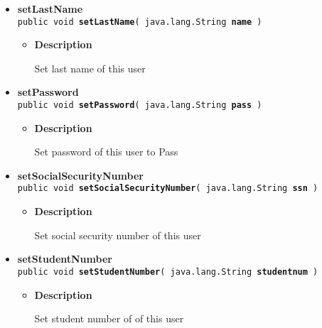 {{{\begin{itemize}
{\begin{itemize}
{Set the preferred language of this user. The language is either "EN" or "FI
}
\item{
{\bf Parameters}
  \begin{itemize}
   \item{
{\tt lang} -- either "FI" or "EN"}
  \end{itemize}
}%
\end{itemize}
}%
 \item{ 
{\bf setLastName}\\
{\tt public void\ {\bf setLastName}( {\tt java.lang.String} {\bf name} )
\label{fi.helsinki.cs.kohahdus.User.setLastName(java.lang.String)}}%
\begin{itemize}
\item{
{\bf Description}

Set last name of this user
}
\end{itemize}
}%
 \item{ 
{\bf setPassword}\\
{\tt public void\ {\bf setPassword}( {\tt java.lang.String} {\bf pass} )
\label{fi.helsinki.cs.kohahdus.User.setPassword(java.lang.String)}}%
\begin{itemize}
\item{
{\bf Description}

Set password of this user to Pass
}
\end{itemize}
}%
 \item{ 
{\bf setSocialSecurityNumber}\\
{\tt public void\ {\bf setSocialSecurityNumber}( {\tt java.lang.String} {\bf ssn} )
\label{fi.helsinki.cs.kohahdus.User.setSocialSecurityNumber(java.lang.String)}}%
\begin{itemize}
\item{
{\bf Description}

Set social security number of this user
}
\end{itemize}
}%
 \item{ 
{\bf setStudentNumber}\\
{\tt public void\ {\bf setStudentNumber}( {\tt java.lang.String} {\bf studentnum} )
\label{fi.helsinki.cs.kohahdus.User.setStudentNumber(java.lang.String)}}%
\begin{itemize}
\item{
{\bf Description}

Set student number of of this user
}
\end{itemize}
}%
\end{itemize}
}
}
}
